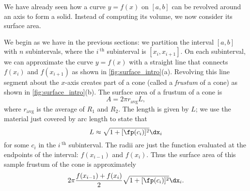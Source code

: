 
We have already seen how a curve $y=f(x)$ on $[a,b]$ can be revolved around an axis to form a solid. Instead of computing its volume, we now consider its surface area.

We begin as we have in the previous sections: we partition the interval $[a,b]$ with $n$ subintervals, where the $i\,^{\text{th}}$ subinterval is $[x_i,x_{i+1}]$. On each subinterval, we can approximate the curve $y=f(x)$ with a straight line that connects $f(x_i)$ and $f(x_{i+1})$ as shown in \autoref{fig:surface_intro}(a). Revolving this line segment about the $x$-axis creates part of a cone (called a \textit{frustum} of a cone) as shown in \autoref{fig:surface_intro}(b). The surface area of a frustum of a cone is
\[A=2\pi r_{\text{avg}} L,\]
where $r_{\text{avg}}$ is the average of $R_1$ and $R_2$.  The length is given by $L$; we use the material just covered by arc length to state that
\[L\approx \sqrt{1+[\fp(c_i)]^2}\dx_i\]
for some $c_i$ in the $i\,^\text{th}$ subinterval. The radii are just the function evaluated at the endpoints of the interval: $f(x_{i-1})$ and $f(x_i)$. Thus the surface area of this sample frustum of the cone is approximately 
\[2\pi\frac{f(x_{i-1})+f(x_i)}2\sqrt{1+[\fp(c_i)]^2}\dx_i.\]

